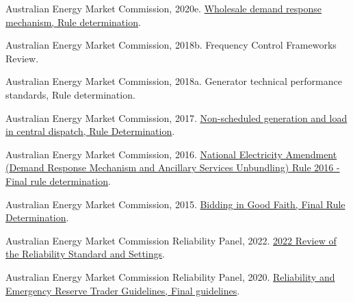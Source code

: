 \documentclass[12pt,a4paper,]{report}
\newlength{\cslhangindent}
\newenvironment{CSLReferences}[2] %
 {%
  \setlength{\parindent}{0pt}
  \ifodd #1 \everypar{\setlength{\hangindent}{\cslhangindent}}\ignorespaces\fi
  \ifnum #2 > 0
  \setlength{\parskip}{#2\baselineskip}
  \fi
 }%
 {}
\begin{document}
\begin{CSLReferences}{1}{0}
\leavevmode{}%
Australian Energy Market Commission, 2020e.
\href{https://www.aemc.gov.au/sites/default/files/documents/final_determination_-_for_publication.pdf}{Wholesale
demand response mechanism, {Rule} determination}.

\leavevmode{}%
Australian Energy Market Commission, 2018b. Frequency {Control
Frameworks Review}.

\leavevmode{}%
Australian Energy Market Commission, 2018a. Generator technical
performance standards, {Rule} determination.

\leavevmode{}%
Australian Energy Market Commission, 2017.
\href{https://www.aemc.gov.au/sites/default/files/content/0bcaf68c-8449-4ce0-aaa6-da223ca6e01c/Final-Determination-ERC0203-Non-scheduled-generation-and-load.pdf}{Non-scheduled
generation and load in central dispatch, {Rule Determination}}.

\leavevmode{}%
Australian Energy Market Commission, 2016.
\href{https://www.aemc.gov.au/sites/default/files/content/68cb8114-113d-4d96-91dc-5cb4b0f9e0ae/ERC0186-DRM-and-ASU-Final-rule-determination-FINAL.PDF}{National
{Electricity Amendment} ({Demand Response Mechanism} and {Ancillary
Services Unbundling}) {Rule} 2016 - {Final} rule determination}.

\leavevmode{}%
Australian Energy Market Commission, 2015.
\href{https://www.aemc.gov.au/sites/default/files/content/815f277c-a015-47d0-bc13-ce3d5faaf96d/Final-Determination.pdf}{Bidding
in {Good Faith}, {Final Rule Determination}}.

\leavevmode{}%
Australian Energy Market Commission Reliability Panel, 2022.
\href{https://www.aemc.gov.au/sites/default/files/2022-09/2022\%20RSS\%20Review\%20Final\%20Report\%20\%281\%29.pdf}{2022
{Review} of the {Reliability Standard} and {Settings}}.

\leavevmode{}%
Australian Energy Market Commission Reliability Panel, 2020.
\href{https://www.aemc.gov.au/sites/default/files/2020-08/Updated\%20Amended\%20Panel\%20RERT\%20Guidelines\%20-\%2018\%20August\%202020\%20-\%20Final\%20for\%20publication_0.pdf}{Reliability
and {Emergency Reserve Trader Guidelines}, {Final} guidelines}.


\end{CSLReferences}
\end{document}
